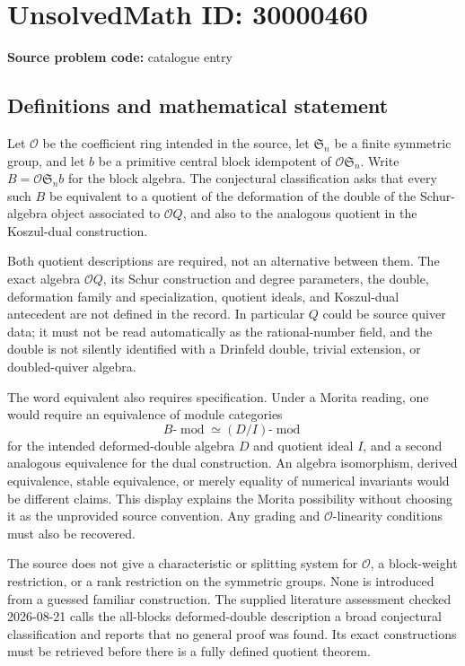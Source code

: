 \documentclass[11pt]{article}
\begin{document}
\section*{UnsolvedMath ID: 30000460}
\textbf{Source problem code:} catalogue entry
\subsection{Definitions and mathematical statement}
Let \(\mathcal O\) be the coefficient ring intended in the source, let \(\mathfrak S_n\) be a finite symmetric group, and let \(b\) be a primitive central block idempotent of \(\mathcal O\mathfrak S_n\). Write \(B=\mathcal O\mathfrak S_n b\) for the block algebra. The conjectural classification asks that every such \(B\) be equivalent to a quotient of the deformation of the double of the Schur-algebra object associated to \(\mathcal O Q\), and also to the analogous quotient in the Koszul-dual construction.

Both quotient descriptions are required, not an alternative between them. The exact algebra \(\mathcal O Q\), its Schur construction and degree parameters, the double, deformation family and specialization, quotient ideals, and Koszul-dual antecedent are not defined in the record. In particular \(Q\) could be source quiver data; it must not be read automatically as the rational-number field, and the double is not silently identified with a Drinfeld double, trivial extension, or doubled-quiver algebra.

The word equivalent also requires specification. Under a Morita reading, one would require an equivalence of module categories
\[
B\text{-}\operatorname{mod}\simeq(D/I)\text{-}\operatorname{mod}
\]
for the intended deformed-double algebra \(D\) and quotient ideal \(I\), and a second analogous equivalence for the dual construction. An algebra isomorphism, derived equivalence, stable equivalence, or merely equality of numerical invariants would be different claims. This display explains the Morita possibility without choosing it as the unprovided source convention. Any grading and \(\mathcal O\)-linearity conditions must also be recovered.

The source does not give a characteristic or splitting system for \(\mathcal O\), a block-weight restriction, or a rank restriction on the symmetric groups. None is introduced from a guessed familiar construction. The supplied literature assessment checked 2026-08-21 calls the all-blocks deformed-double description a broad conjectural classification and reports that no general proof was found. Its exact constructions must be retrieved before there is a fully defined quotient theorem.
\end{document}
